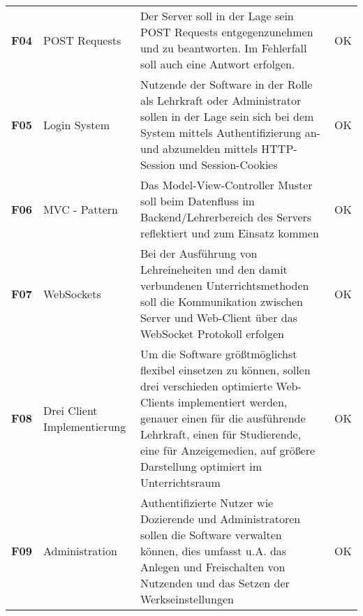 \begin{longtable}{llXc}
   \rowcolor[HTML]{EFEFEF}
   \textbf{F04}         & POST Requests                                             & Der Server soll in der Lage sein POST Requests entgegenzunehmen und zu beantworten. Im Fehlerfall soll auch eine Antwort erfolgen.                                                                                                                                            & OK              \\
   \rowcolor[HTML]{FFFFFF}
   \textbf{F05}         & Login System                                              & Nutzende der Software in der Rolle als Lehrkraft oder Administrator sollen in der Lage sein sich bei dem System mittels Authentifizierung an- und abzumelden mittels HTTP-Session und Session-Cookies                                                                                 & OK              \\
   \rowcolor[HTML]{EFEFEF}
   \textbf{F06}         & MVC - Pattern                                             & Das Model-View-Controller Muster soll beim Datenfluss im Backend/Lehrerbereich des Servers reflektiert und zum Einsatz kommen                                                                                                                                                         & OK              \\
   \rowcolor[HTML]{FFFFFF}
   \textbf{F07}         & WebSockets                                                & Bei der Ausführung von Lehreineheiten und den damit verbundenen Unterrichtsmethoden soll die Kommunikation zwischen Server und Web-Client über das WebSocket Protokoll erfolgen                                                                                                & OK              \\
   \rowcolor[HTML]{EFEFEF}
   \textbf{F08}         & Drei Client Implementierung                               & Um die Software größtmöglichst flexibel einsetzen zu können, sollen drei verschieden optimierte Web-Clients implementiert werden, genauer einen für die ausführende Lehrkraft, einen für Studierende, eine für Anzeigemedien, auf größere Darstellung optimiert im Unterrichtsraum & OK              \\
   \rowcolor[HTML]{FFFFFF}
   \textbf{F09}         & Administration                                            & Authentifizierte Nutzer wie Dozierende und Administratoren sollen die Software verwalten können, dies umfasst u.A. das Anlegen und Freischalten von Nutzenden und das Setzen der Werkseinstellungen                                                                            & OK              \\

\end{longtable}
